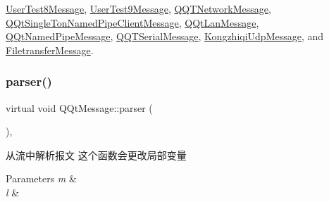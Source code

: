 \mbox{\hyperlink{class_user_test8_message_adb7a902be87629d32761d5bd23a23d05}{User\+Test8\+Message}}, \mbox{\hyperlink{class_user_test9_message_a331d2fe4866837706295952962ff41c1}{User\+Test9\+Message}}, \mbox{\hyperlink{class_q_q_t_network_message_a9d1d30ef9d14a5a4586e234a00ab19d4}{Q\+Q\+T\+Network\+Message}}, \mbox{\hyperlink{class_q_qt_single_ton_named_pipe_client_message_a03f8f20ff09f6e531843dbc55304c49b}{Q\+Qt\+Single\+Ton\+Named\+Pipe\+Client\+Message}}, \mbox{\hyperlink{class_q_qt_lan_message_ad06aa6cee4485251e1c9ae53e35a2cdc}{Q\+Qt\+Lan\+Message}}, \mbox{\hyperlink{class_q_qt_named_pipe_message_a3977c2f52260318380edc09d2d1f7df0}{Q\+Qt\+Named\+Pipe\+Message}}, \mbox{\hyperlink{class_q_q_t_serial_message_a4f677828bfdb05d584c761413b6c15bc}{Q\+Q\+T\+Serial\+Message}}, \mbox{\hyperlink{class_kongzhiqi_udp_message_aa66ce04fb9924be5e181e574233bbeb7}{Kongzhiqi\+Udp\+Message}}, and \mbox{\hyperlink{class_filetransfer_message_a455e81f50ff70980649f198f8a3250ce}{Filetransfer\+Message}}.

\mbox{\label{class_q_qt_message_a0bc25669bdd61490b1d8df6d77565f31}} 
\subsubsection{\texorpdfstring{parser()}{parser()}}
{\footnotesize\ttfamily virtual void Q\+Qt\+Message\+::parser (\begin{DoxyParamCaption}\item[{const Q\+Byte\+Array \&}]{ }\end{DoxyParamCaption})\hspace{0.3cm}{\ttfamily [inline]}, {\ttfamily [virtual]}}



从流中解析报文 这个函数会更改局部变量 


\begin{DoxyParams}{Parameters}
{\em m} & \\
\hline
{\em l} & \\
\hline
\end{DoxyParams}


